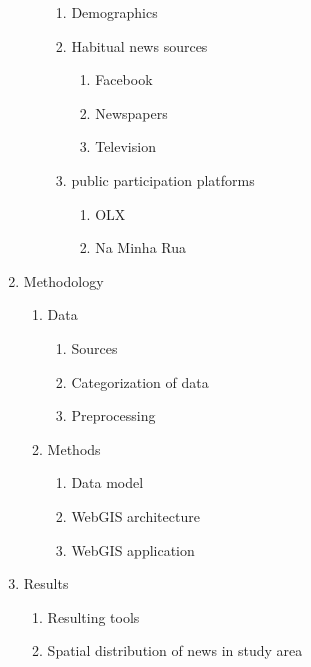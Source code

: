 \begin{enumerate}
\begin{enumerate}
\begin{enumerate}
			\item Demographics
			\item Habitual news sources
			\begin{enumerate}
				\item Facebook
				\item Newspapers
				\item Television
			\end{enumerate}
			\item public participation platforms
			\begin{enumerate}
				\item OLX
				\item Na Minha Rua
			\end{enumerate}
		\end{enumerate}
	\end{enumerate}
	\item Methodology
	\begin{enumerate}
		\item Data
		\begin{enumerate}
			\item Sources
			\item Categorization of data
			\item Preprocessing
		\end{enumerate}
		\item Methods
		\begin{enumerate}
			\item Data model
			\item WebGIS architecture
			\item WebGIS application
		\end{enumerate}
	\end{enumerate}
	\item Results
	\begin{enumerate}
		\item Resulting tools
		\item Spatial distribution of news in study area

\end{enumerate}
\end{enumerate}
